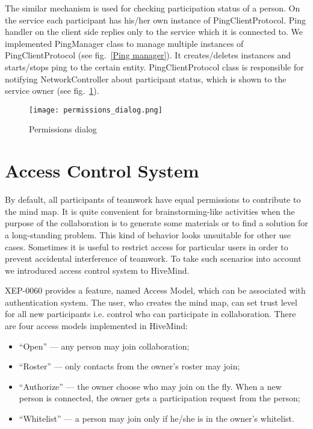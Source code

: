 The similar mechanism is used for checking participation status of a person. On
the service each participant has his/her own instance of PingClientProtocol. Ping
handler on the client side replies only to the service which it is connected
to. We implemented PingManager class to manage multiple instances of
PingClientProtocol (see fig.~\ref{Ping manager}).  It creates/deletes instances
and starts/stops ping to the certain entity. PingClientProtocol class is
responsible for notifying NetworkController about participant status, which is
shown to the service owner (see fig.~\ref{Permissions dialog}).

\begin{figure}[b] \centering
\texttt{[image: permissions\_dialog.png]}
  \caption{Permissions dialog}
  \label{Permissions dialog}
\end{figure}

\section{Access Control System}
\label{Access control system}

By default, all participants of teamwork have equal permissions to contribute to
the mind map. It is quite convenient for brainstorming-like activities when the
purpose of the collaboration is to generate some materials or to find a solution
for a long-standing problem. This kind of behavior looks unsuitable for other
use cases. Sometimes it is useful to restrict access for particular users in
order to prevent accidental interference of teamwork. To take such scenarios
into account we introduced access control system to HiveMind.

XEP-0060 provides a feature, named Access Model, which can be associated with
authentication system. The user, who creates the mind map, can set trust level
for all new participants i.e. control who can participate in collaboration.
There are four access models implemented in HiveMind:
\begin{itemize}
\item ``Open'' --- any person may join collaboration;
\item ``Roster'' --- only contacts from the owner’s roster may join;
\item ``Authorize'' --- the owner choose who may join on the fly. When a new
  person is connected, the owner gets a participation request from the person;
\item ``Whitelist'' --- a person may join only if he/she is in the owner’s
  whitelist.
\end{itemize}

